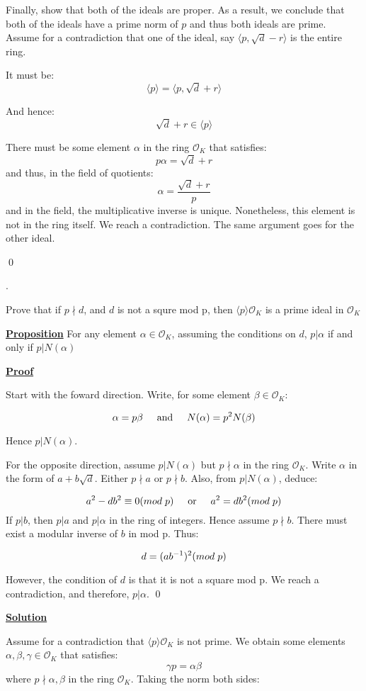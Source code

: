 \documentclass{article}
\newcommand{\new}[1]{
    \vspace{2mm}
    \noindent
    \textbf{
    \underline{#1}}
}
\def\_{{\hspace{1mm}}}
\newcounter{problemcnt}
\newcommand{\Problem}{{
    \vspace{5mm}
    \stepcounter{problemcnt}
    \noindent
    \arabic{problemcnt}. 
}
}
\newcommand{\Proof}{{
    \vspace{2mm}
    \noindent
    \textbf{
    \underline{Proof}}
}
}
\newcommand{\textOr}{
    \hspace{5mm}
    \textrm{or}
    \hspace{5mm}
}
\newcommand{\textAnd}{
    \hspace{5mm}
    \textrm{and}
    \hspace{5mm}
}
\newcommand{\<}{{{
    \langle
}}}
\def\>{{{
    \rangle
}}}
\newcommand{\ringInt}{
    {\mathcal{O}}
}
\begin{document}
Finally, show that both of the ideals are proper. As a result, 
we conclude that both of the ideals have a prime norm of $p$ 
and thus both ideals are prime. Assume for a contradiction that 
one of the ideal, say $\<p, \sqrt{d}-r\>$ is the entire ring. 

It must be:
\[
    \<p\>  = \<p, \sqrt{d}+r\>
\]

And hence:
\[
    \sqrt{d}+r \in \<p\>
\]

There must be some element $\alpha$ in the ring $\ringInt_K$ that satisfies:
\[
    p\alpha = \sqrt{d}+r
\]
and thus, in the field of quotients:
\[
    \alpha = \frac{\sqrt{d}+r}{p}
\]
and in the field, the multiplicative inverse is unique. Nonetheless, 
this element is not in the ring itself. We reach a contradiction. 
The same argument goes for the other ideal. 

\qed

\newpage

\Problem 
Prove that if $p \nmid d$, and $d$ is not a squre mod p, then 
$\<p\>\ringInt_K$ is a prime ideal in $\ringInt_K$

\new{Proposition} For any element $\alpha \in \ringInt_K$, 
assuming the conditions on $d$, $p|\alpha$ if and only if 
$p|N(\alpha)$

\Proof 
Start with the foward direction. Write, for 
some element $\beta \in \ringInt_K$:

\[
    \alpha = p\beta \textAnd N(\alpha) = p^2N(\beta)
\]

Hence $p|N(\alpha)$. 

For the opposite direction, assume $p|N(\alpha)$ but 
$p \nmid \alpha$ in the ring $\ringInt_K$. Write $\alpha$ 
in the form of $a+b\sqrt{d}$. Either $p\nmid a$ or $p \nmid b$. 
Also, from $p|N(\alpha)$, deduce:

\[
    a^2-db^2 \equiv 0 (mod\_p) 
    \textOr a^2 = db^2 (mod\_p)
\]
If $p|b$, then $p|a$ and $p|\alpha$ in the ring of integers. 
Hence assume $p\nmid b$. There must exist a modular inverse of 
$b$ in mod p. Thus:

\[
    d = (ab^{-1})^2 (mod\_p)
\]

However, the condition of $d$ is that it is not a square mod 
p. We reach a contradiction, and therefore, $p|\alpha$. \qed


\new{Solution}
Assume for a contradiction that $\<p\>\ringInt_K$ is not prime. 
We obtain some elements 
$\alpha, \beta, \gamma \in \ringInt_K$ that satisfies:
\[
    \gamma p = \alpha \beta
\]
where $p\nmid \alpha, \beta$ in the ring $\ringInt_K$. 
Taking the norm both sides:
\end{document}
